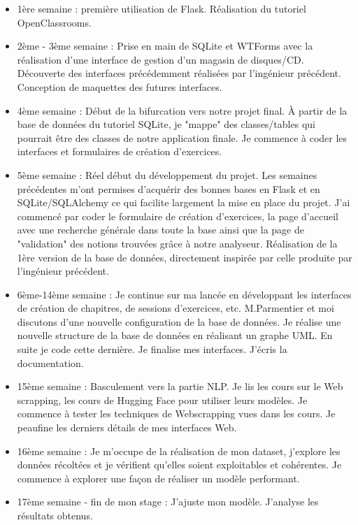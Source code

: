 \documentclass[12pt]{article}
\begin{document}
\begin{itemize}
    \item 1ère semaine : première utilisation de Flask. Réalisation du tutoriel OpenClassrooms. 
    
    \item 2ème - 3ème semaine : Prise en main de SQLite et WTForms avec la réalisation d'une interface de gestion d'un magasin de disques/CD. Découverte des interfaces précédemment réalisées par l'ingénieur précédent. Conception de maquettes des futures interfaces.
    
    \item 4ème semaine : Début de la bifurcation vers notre projet final. À partir de la base de données du tutoriel SQLite, je "mappe" des classes/tables qui pourrait être des classes de notre application finale. Je commence à coder les interfaces et formulaires de création d'exercices.
    
    \item 5ème semaine : Réel début du développement du projet. Les semaines précédentes m'ont permises d'acquérir des bonnes bases en Flask et en SQLite/SQLAlchemy ce qui facilite largement la mise en place du projet. J'ai commencé par coder le formulaire de création d'exercices, la page d'accueil avec une recherche générale dans toute la base ainsi que la page de "validation" des notions trouvées grâce à notre analyseur. Réalisation de la 1ère version de la base de données, directement inspirée par celle produite par l'ingénieur précédent.
    
    \item 6ème-14ème semaine : Je continue sur ma lancée en développant les interfaces de création de chapitres, de sessions d'exercices, etc. M.Parmentier et moi discutons d'une nouvelle configuration de la base de données. Je réalise une nouvelle structure de la base de données en réalisant un graphe UML. En suite je code cette dernière. Je finalise mes interfaces. J'écris la documentation.
    
    \item 15ème semaine : Basculement vers la partie NLP. Je lis les cours sur le Web scrapping, les cours de Hugging Face pour utiliser leurs modèles. Je commence à tester les techniques de Webscrapping vues dans les cours. Je peaufine les derniers détails de mes interfaces Web.
    
    \item 16ème semaine : Je m'occupe de la réalisation de mon dataset, j'explore les données récoltées et je vérifient qu'elles soient exploitables et cohérentes. Je commence à explorer une façon de réaliser un modèle performant.
    
    \item 17ème semaine - fin de mon stage : J'ajuste mon modèle. J'analyse les résultats obtenus. 

\end{itemize}
\end{document}
